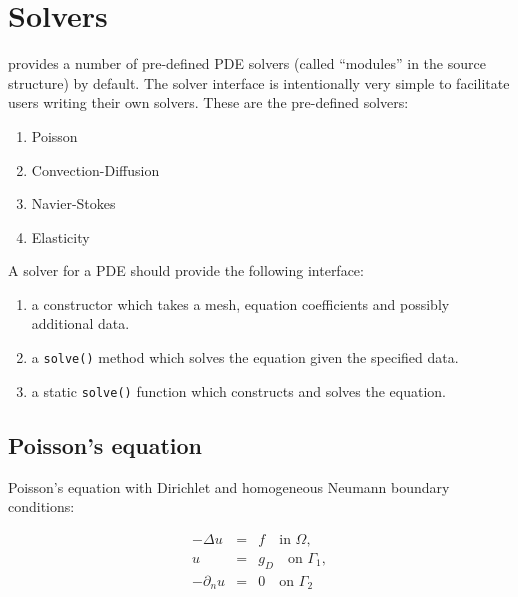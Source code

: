 \chapter{Solvers}


\dolfin{} provides a number of pre-defined PDE solvers (called
``modules'' in the source structure) by default. The solver interface
is intentionally very simple to facilitate users writing their own
solvers. These are the pre-defined solvers:

\begin{enumerate}
\item
Poisson
\item
Convection-Diffusion
\item
Navier-Stokes
\item
Elasticity
\end{enumerate}

A solver for a PDE should provide the following interface:

\begin{enumerate}
\item
a constructor which takes a mesh, equation coefficients and possibly
additional data.
\item
a \texttt{solve()} method which solves the equation given the
specified data.
\item
a static \texttt{solve()} function which constructs and solves the
equation.
\end{enumerate}



\section{Poisson's equation}

Poisson's equation with Dirichlet and homogeneous Neumann boundary
conditions:

\begin{equation} \label{eq:poisson}
  \begin{array}{rcl}
    - \Delta u &=& f \quad \mbox{in } \Omega, \\
    u &=& g_D \quad \mbox{on } \Gamma_1, \\
    - \partial_n u &=& 0 \quad \mbox{on } \Gamma_2
  \end{array}
\end{equation}

